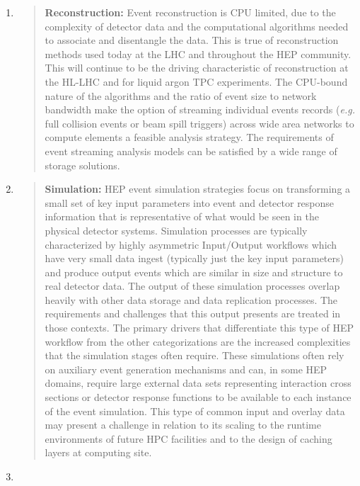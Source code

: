 \documentclass[12pt,a4paper]{article}
\begin{document}
\begin{enumerate}
\def\labelenumi{\arabic{enumi})}
\item
  \begin{quote}
  \textbf{Reconstruction:} Event reconstruction is CPU limited, due to
  the complexity of detector data and the computational algorithms
  needed to associate and disentangle the data. This is true of
  reconstruction methods used today at the LHC and throughout the HEP
  community. This will continue to be the driving characteristic of
  reconstruction at the HL-LHC and for liquid argon TPC experiments. The
  CPU-bound nature of the algorithms and the ratio of event size to
  network bandwidth make the option of streaming individual events
  records (\emph{e.g.} full collision events or beam spill triggers)
  across wide area networks to compute elements a feasible analysis
  strategy. The requirements of event streaming analysis models can be
  satisfied by a wide range of storage solutions.
  \end{quote}
\item
  \begin{quote}
  \textbf{Simulation:} HEP event simulation strategies focus on
  transforming a small set of key input parameters into event and
  detector response information that is representative of what would be
  seen in the physical detector systems. Simulation processes are
  typically characterized by highly asymmetric Input/Output workflows
  which have very small data ingest (typically just the key input
  parameters) and produce output events which are similar in size and
  structure to real detector data. The output of these simulation
  processes overlap heavily with other data storage and data replication
  processes. The requirements and challenges that this output presents
  are treated in those contexts. The primary drivers that differentiate
  this type of HEP workflow from the other categorizations are the
  increased complexities that the simulation stages often require. These
  simulations often rely on auxiliary event generation mechanisms and
  can, in some HEP domains, require large external data sets
  representing interaction cross sections or detector response functions
  to be available to each instance of the event simulation. This type of
  common input and overlay data may present a challenge in relation to
  its scaling to the runtime environments of future HPC facilities and
  to the design of caching layers at computing site.
  \end{quote}
\item

\end{enumerate}
\end{document}
